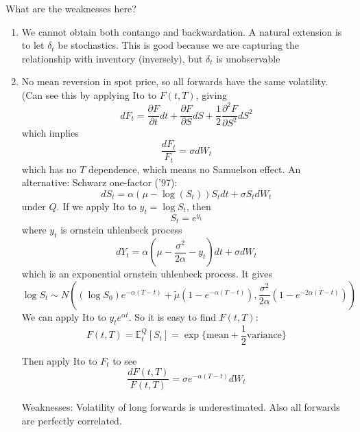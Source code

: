 What are the weaknesses here?
\begin{enumerate}
	\item We cannot obtain both contango and backwardation. A natural extension is to let $\delta_t$ be stochastics. This is good because we are capturing the relationship with inventory (inversely), but $\delta_t$ is unobservable
	\item No mean reversion in spot price, so all forwards have the same volatility. (Can see this by applying Ito to $F(t,T)$, giving
	\begin{equation}
		dF_t = \frac{\partial F}{\partial t}dt + \frac{\partial F}{\partial S}dS + \frac12 \frac{\partial^2 F}{\partial S^2} dS^2
	\end{equation}
	which implies
	\begin{equation}
		\frac{dF_t}{F_t} = \sigma dW_t
	\end{equation}
	which has no $T$ dependence, which means no Samuelson effect.
	An alternative: Schwarz one-factor ('97):
	\begin{equation}
		dS_t = \alpha(\mu - \log(S_t))S_tdt + \sigma S_t dW_t
	\end{equation}
	under $Q$. If we apply Ito to $y_t = \log S_t$, then
	\begin{equation}
		S_t = e^{y_t}
	\end{equation}
	where $y_t$ is ornstein uhlenbeck process
	\begin{equation}
		dY_t = \alpha(\mu - \frac{\sigma^2}{2\alpha} - y_t)dt + \sigma dW_t
	\end{equation}
	which is an exponential ornstein uhlenbeck process. It gives
	\begin{equation}
		\log S_t \sim N( (\log S_0) e^{-\alpha(T-t)} + \tilde{\mu}(1-e^{-\alpha(T-t)}) ,  \frac{\sigma^2}{2\alpha} (1-e^{-2\alpha(T-t)}))
	\end{equation}
	We can apply Ito to $y_te^{\alpha t}$. So it is easy to find $F(t,T)$:
	\begin{equation}
		F(t,T) = \mathbb{E}_t^Q\left[ S_t \right] = \exp \{ \text{mean} + \frac12 \text{variance} \}
	\end{equation}
	
	Then apply Ito to $F_t$ to see
	\begin{equation}
		\frac{dF(t,T)}{F(t,T)} = \sigma e^{-\alpha(T-t)}dW_t
	\end{equation}
	
	Weaknesses: Volatility of long forwards is underestimated. Also all forwards are perfectly correlated.
\end{enumerate}


